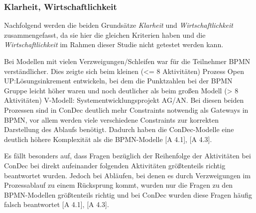 \subsubsection{Klarheit, Wirtschaftlichkeit}



Nachfolgend werden die beiden Grundsätze \textit{Klarheit} und \textit{Wirtschaftlichkeit} zusammengefasst, da sie hier die gleichen Kriterien haben und die \textit{Wirtschaftlichkeit} im Rahmen dieser Studie nicht getestet werden kann.\newline

Bei Modellen mit  vielen Verzweigungen/Schleifen war für die Teilnehmer BPMN verständlicher. Dies zeigte sich beim kleinen (<= 8 Aktivitäten) Prozess \grqq Open UP:Lösungsinkrement entwickeln\grqq, bei dem die Punktzahlen bei der BPMN Gruppe leicht höher waren und noch deutlicher als beim großen Modell (> 8 Aktivitäten) \grqq V-Modell: Systementwicklungsprojekt AG/AN\grqq. Bei diesen beiden Prozessen sind in ConDec deutlich mehr Constraints notwendig als Gateways in BPMN, vor allem werden viele verschiedene Constraints zur korrekten Darstellung des Ablaufs benötigt. Dadurch haben die ConDec-Modelle eine deutlich höhere Komplexität als die BPMN-Modelle [A 4.1], [A 4.3].\newline

Es fällt besonders auf, dass Fragen bezüglich der Reihenfolge der Aktivitäten bei ConDec bei direkt aufeinander folgenden Aktivitäten größtenteils richtig beantwortet wurden. Jedoch bei Abläufen, bei denen es durch Verzweigungen im Prozessablauf zu einem Rücksprung kommt, wurden nur die Fragen zu den BPMN-Modellen größtenteils richtig und bei ConDec wurden diese Fragen häufig falsch beantwortet [A 4.1], [A 4.3].\newline

